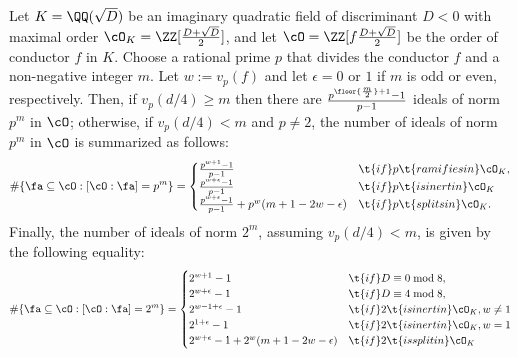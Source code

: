 \documentclass[11pt, proquest]{uwthesis}
\begin{document}
\begin{theorem}\label{Thm:CondIdeals}
  Let $K = \QQ(\sqrt{D})$ be an imaginary quadratic field of discriminant $D<0$ with maximal order $\cO_K = \ZZ[\frac{D+\sqrt{D}}{2}]$, and let $\cO = \ZZ[f\frac{D+\sqrt{D}}{2}]$ be the order of conductor $f$ in $K$. Choose a rational prime $p$ that divides the conductor $f$ and a non-negative integer $m$. Let $w:= v_p(f)$ and let $\epsilon = 0$ or $1$ if $m$ is odd or even, respectively. Then, if $v_p(d/4)\geq m$ then there are $\frac{p^{\floor{\frac{m}{2}}+1}-1}{p-1}$ ideals of norm $p^m$ in $\cO$; otherwise, if $v_p(d/4) < m$ and $p\ne 2$, the number of ideals of norm $p^m$ in $\cO$ is summarized as follows:
  \[
    \#\{\fa\subseteq \cO: [\cO:\fa] = p^m\} = \begin{cases}
      \frac{p^{w+1}-1}{p-1}                                & \t{if } p \t{ ramifies in }\cO_K, \\
      \frac{p^{w+\epsilon} -1}{p-1}                        & \t{if } p \t{ is inert in }\cO_K  \\
      \frac{p^{w+\epsilon} -1}{p-1} + p^w(m+1-2w-\epsilon) & \t{if } p \t{ splits in }\cO_K.
    \end{cases}
  \]
  Finally, the number of ideals of norm $2^m$, assuming $v_p(d/4) < m$, is given by the following equality:
  \[
    \#\{\fa\subseteq \cO: [\cO:\fa] = 2^m\} = \begin{cases}
      2^{w+1}-1                                 & \t{if } D\equiv 0\bmod 8,         \\
      2^{w+\epsilon}-1                          & \t{if } D\equiv 4\bmod 8,         \\
      2^{w-1+\epsilon}-1                        & \t{if } 2 \t{ is inert in }\cO_K, w\ne1\\
      2^{1+\epsilon}-1                        & \t{if } 2 \t{ is inert in }\cO_K, w=1 \\
      2^{w+\epsilon}-1+2^{w}(m+1-2w-\epsilon) & \t{if } 2 \t{ is split in }\cO_K
    \end{cases}
  \]
\end{theorem}
\end{document}
